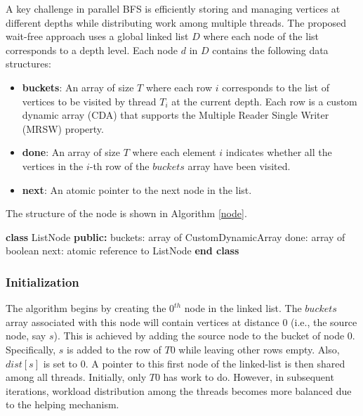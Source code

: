 A key challenge in parallel BFS is efficiently storing and managing vertices at different depths while distributing work among multiple threads. The proposed wait-free approach uses a global linked list $D$ where each node of the list corresponds to a depth level. Each node $d$ in $D$ contains the following data structures:
\begin{itemize}
    \item \textbf{buckets}: An array of size $T$ where each row $i$ corresponds to the list of vertices to be visited by thread $T_i$ at the current depth. Each row is a custom dynamic array (CDA) that supports the Multiple Reader Single Writer (MRSW) property.
    \item \textbf{done}: An array of size $T$ where each element $i$ indicates whether all the vertices in the $i$-th row of the $buckets$ array have been visited.
    \item \textbf{next}: An atomic pointer to the next node in the list.
\end{itemize}
The structure of the node is shown in Algorithm \ref{node}.

\begin{algorithm}
\caption{Definition of ListNode}
\label{node}
\begin{algorithmic}[1]
\State \textbf{class} ListNode
\State \quad \textbf{public:}
\State \quad \quad buckets: array of CustomDynamicArray
\State \quad \quad done: array of boolean
\State \quad \quad next: atomic reference to ListNode
\State \textbf{end class}
\end{algorithmic}
\end{algorithm}

\subsubsection{Initialization}

The algorithm begins by creating the $0^{th}$ node in the linked list. The $buckets$ array associated with this node will contain vertices at distance $0$ (i.e., the source node, say $s$). This is achieved by adding the source node to the bucket of node $0$. Specifically, $s$ is added to the row of $T0$ while leaving other rows empty. Also, $dist[s]$ is set to $0$. A pointer to this first node of the linked-list is then shared among all threads. Initially, only $T0$ has work to do. However, in subsequent iterations, workload distribution among the threads becomes more balanced due to the helping mechanism.

